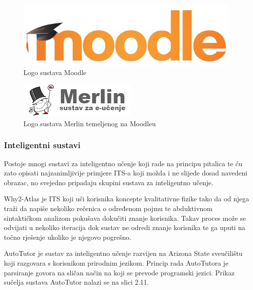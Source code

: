 \documentclass[times, utf8, zavrsni, numeric]{fer}
\begin{document}
\begin{figure}[htb]
	\centering
	\includegraphics[]{img/moodle.jpg}
	\caption{Logo sustava Moodle\citep{moodlelogopic}}
	\label{fig:moodle}
\end{figure}

\begin{figure}[htb]
	\centering
	\includegraphics[]{img/merlin.jpg}
	\caption{Logo sustava Merlin temeljenog na Moodleu\citep{merlinpic}}
	\label{fig:merlin}
\end{figure}

\subsubsection{Inteligentni sustavi}
Postoje mnogi sustavi za inteligentno učenje koji rade na principu pitalica te ću zato opisati najzanimljivije primjere ITS-a koji možda i ne slijede dosad navedeni obrazac, no svejedno pripadaju skupini sustava za inteligentno učenje.
\par
Why2-Atlas je ITS koji uči korisnika koncepte kvalitativne fizike tako da od njega traži da napiše nekoliko rečenica o određenom pojmu te abduktivnom sintaktičkom analizom pokušava dokučiti znanje korisnika. Takav proces može se odvijati u nekoliko iteracija dok sustav ne odredi znanje korisnika te ga uputi na točno rješenje ukoliko je njegovo pogrešno.\citep{why2atlas}
\par
AutoTutor je sustav za inteligentno učenje razvijen na Arizona State sveučilištu koji razgovara s korisnikom prirodnim jezikom. Princip rada AutoTutora je parsiranje govora na sličan način na koji se prevode programski jezici.\citep{autotutor} Prikaz sučelja sustava AutoTutor nalazi se na slici 2.11.
\end{document}
